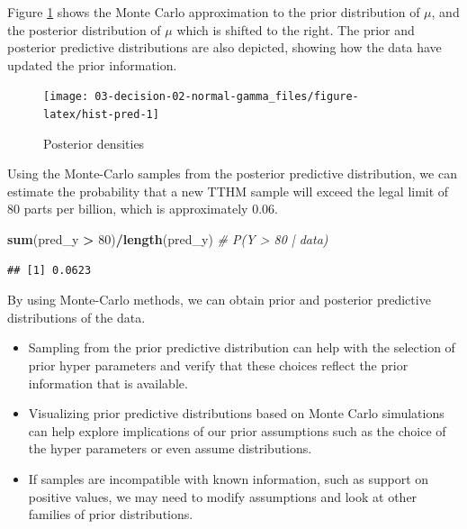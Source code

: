 \documentclass[]{book}
\newenvironment{Shaded}{\begin{snugshade}}{\end{snugshade}}
\newcommand{\KeywordTok}[1]{\textcolor[rgb]{0.13,0.29,0.53}{\textbf{#1}}}
\newcommand{\DecValTok}[1]{\textcolor[rgb]{0.00,0.00,0.81}{#1}}
\newcommand{\StringTok}[1]{\textcolor[rgb]{0.31,0.60,0.02}{#1}}
\newcommand{\CommentTok}[1]{\textcolor[rgb]{0.56,0.35,0.01}{\textit{#1}}}
\newcommand{\OperatorTok}[1]{\textcolor[rgb]{0.81,0.36,0.00}{\textbf{#1}}}
\newcommand{\NormalTok}[1]{#1}
\theoremstyle{definition}
\theoremstyle{definition}
\theoremstyle{definition}
\theoremstyle{remark}
\begin{document}
Figure \ref{fig:hist-pred} shows the Monte Carlo approximation to the
prior distribution of \(\mu\), and the posterior distribution of \(\mu\)
which is shifted to the right. The prior and posterior predictive
distributions are also depicted, showing how the data have updated the
prior information.

\begin{figure}

{\centering \texttt{[image: 03-decision-02-normal-gamma\_files/figure-latex/hist-pred-1]} 

}

\caption{Posterior densities}\label{fig:hist-pred}
\end{figure}

Using the Monte-Carlo samples from the posterior predictive
distribution, we can estimate the probability that a new TTHM sample
will exceed the legal limit of 80 parts per billion, which is
approximately 0.06.

\begin{Shaded}
\begin{Highlighting}[]
\KeywordTok{sum}\NormalTok{(pred_y }\OperatorTok{>}\StringTok{ }\DecValTok{80}\NormalTok{)}\OperatorTok{/}\KeywordTok{length}\NormalTok{(pred_y)  }\CommentTok{# P(Y > 80 | data)}
\end{Highlighting}
\end{Shaded}

\begin{verbatim}
## [1] 0.0623
\end{verbatim}

By using Monte-Carlo methods, we can obtain prior and posterior
predictive distributions of the data.

\begin{itemize}
\item
  Sampling from the prior predictive distribution can help with the
  selection of prior hyper parameters and verify that these choices
  reflect the prior information that is available.
\item
  Visualizing prior predictive distributions based on Monte Carlo
  simulations can help explore implications of our prior assumptions
  such as the choice of the hyper parameters or even assume
  distributions.
\item
  If samples are incompatible with known information, such as support on
  positive values, we may need to modify assumptions and look at other
  families of prior distributions.
\end{itemize}
\end{document}
